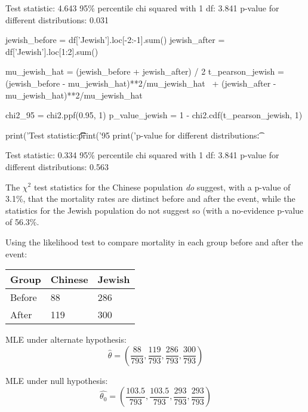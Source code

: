 \begin{console}
Test statistic:                         4.643
95\% percentile chi squared with 1 df:   3.841
p-value for different distributions:    0.031
\end{console}

\begin{python}
jewish_before = df['Jewish'].loc[-2:-1].sum()
jewish_after = df['Jewish'].loc[1:2].sum()

mu_jewish_hat = (jewish_before + jewish_after) / 2
t_pearson_jewish = (jewish_before - mu_jewish_hat)**2/mu_jewish_hat \
    + (jewish_after - mu_jewish_hat)**2/mu_jewish_hat

chi2_95 = chi2.ppf(0.95, 1)
p_value_jewish = 1 - chi2.cdf(t_pearson_jewish, 1)

print('Test statistic:\t\t\t\t%
print('95%
print('p-value for different distributions:\t%
\end{python}

\begin{console}
Test statistic:                         0.334
95\% percentile chi squared with 1 df:   3.841
p-value for different distributions:    0.563
\end{console}

The \(\chi^2\) test statistics for the Chinese population \emph{do}
suggest, with a p-value of 3.1\%, that the mortality rates are distinct
before and after the event, while the statistics for the Jewish
population do not suggest so (with a no-evidence p-value of 56.3\%.

Using the likelihood test to compare mortality in each group before and
after the event:

\begin{longtable}[]{@{}lll@{}}
\toprule\noalign{}
Group & Chinese & Jewish \\
\midrule\noalign{}
\endhead
\bottomrule\noalign{}
\endlastfoot
Before & 88 & 286 \\
After & 119 & 300 \\
\end{longtable}

MLE under alternate hypothesis:
\[\hat{\theta} = \left( \frac{88}{793}, \frac{119}{793}, \frac{286}{793}, \frac{300}{793} \right)\]

MLE under null hypothesis:
\[\hat{\theta_0} =\left( \frac{103.5}{793}, \frac{103.5}{793}, \frac{293}{793}, \frac{293}{793} \right)\]

